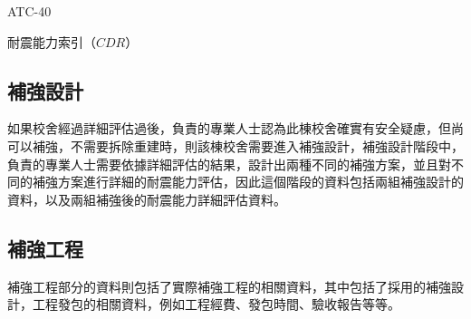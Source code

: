 ATC-40\cite{applied1996seismic}

耐震能力索引（$CDR$）

\subsection{補強設計}

如果校舍經過詳細評估過後，負責的專業人士認為此棟校舍確實有安全疑慮，但尚可以補強，不需要拆除重建時，則該棟校舍需要進入補強設計，補強設計階段中，負責的專業人士需要依據詳細評估的結果，設計出兩種不同的補強方案，並且對不同的補強方案進行詳細的耐震能力評估，因此這個階段的資料包括兩組補強設計的資料，以及兩組補強後的耐震能力詳細評估資料。

\subsection{補強工程}

補強工程部分的資料則包括了實際補強工程的相關資料，其中包括了採用的補強設計，工程發包的相關資料，例如工程經費、發包時間、驗收報告等等。